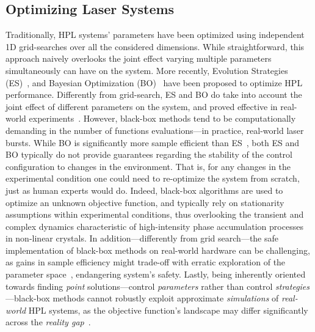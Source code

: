 \subsection{Optimizing Laser Systems}
Traditionally, HPL systems' parameters have been optimized using independent 1D grid-searches over all the considered dimensions. 
While straightforward, this approach naively overlooks the joint effect varying multiple parameters simultaneously can have on the system. 
More recently, Evolution Strategies (ES)~\citep{baumert1997femtosecond, arteaga2014supercontinuum, woodward2016towards}, and Bayesian Optimization (BO)~\citep{loughran2023automated, shalloo2020automation, capuano2022laser, anjum2024high} have been proposed to optimize HPL performance. 
Differently from grid-search, ES and BO do take into account the joint effect of different parameters on the system, and proved effective in real-world experiments~\citep{shalloo2020automation}. 
However, black-box methods tend to be computationally demanding in the number of functions evaluations---in practice, real-world laser bursts. 
While BO is significantly more sample efficient than ES~\citep{capuano2022laser}, both ES and BO typically do not provide guarantees regarding the stability of the control configuration to changes in the environment.
That is, for any changes in the experimental condition one could need to re-optimize the system from scratch, just as human experts would do. 
Indeed, black-box algorithms are used to optimize an unknown objective function, and typically rely on stationarity assumptions within experimental conditions, thus overlooking the transient and complex dynamics characteristic of high-intensity phase accumulation processes in non-linear crystals.
In addition---differently from grid search---the safe implementation of black-box methods on real-world hardware can be challenging, as gains in sample efficiency might trade-off with erratic exploration of the parameter space~\citep{capuano2023temporl}, endangering system's safety.
Lastly, being inherently oriented towards finding \textit{point} solutions---control \textit{parameters} rather than control \textit{strategies}---black-box methods cannot robustly exploit approximate \textit{simulations} of \textit{real-world} HPL systems, as the objective function's landscape may differ significantly across the \textit{reality gap}~\citep{tobin2017domain}.


